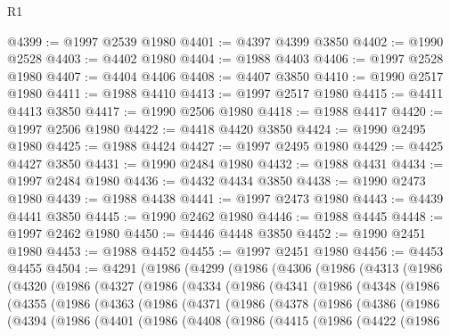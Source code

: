 \begin{lexlean}{R1}
\begin{coremodule}
@4399 := @1997 @2539 @1980
@4401 := @4397 @4399 @3850
@4402 := @1990 @2528
@4403 := @4402 @1980
@4404 := @1988 @4403
@4406 := @1997 @2528 @1980
@4407 := @4404 @4406
@4408 := @4407 @3850
@4410 := @1990 @2517 @1980
@4411 := @1988 @4410
@4413 := @1997 @2517 @1980
@4415 := @4411 @4413 @3850
@4417 := @1990 @2506 @1980
@4418 := @1988 @4417
@4420 := @1997 @2506 @1980
@4422 := @4418 @4420 @3850
@4424 := @1990 @2495 @1980
@4425 := @1988 @4424
@4427 := @1997 @2495 @1980
@4429 := @4425 @4427 @3850
@4431 := @1990 @2484 @1980
@4432 := @1988 @4431
@4434 := @1997 @2484 @1980
@4436 := @4432 @4434 @3850
@4438 := @1990 @2473 @1980
@4439 := @1988 @4438
@4441 := @1997 @2473 @1980
@4443 := @4439 @4441 @3850
@4445 := @1990 @2462 @1980
@4446 := @1988 @4445
@4448 := @1997 @2462 @1980
@4450 := @4446 @4448 @3850
@4452 := @1990 @2451 @1980
@4453 := @1988 @4452
@4455 := @1997 @2451 @1980
@4456 := @4453 @4455
@4504 := @4291
    (@1986
      (@4299
        (@1986
          (@4306
            (@1986
              (@4313
                (@1986
                  (@4320
                    (@1986
                      (@4327
                        (@1986
                          (@4334
                            (@1986
                              (@4341
                                (@1986
                                  (@4348
                                    (@1986
                                      (@4355
                                        (@1986
                                          (@4363
                                            (@1986
                                              (@4371
                                                (@1986
                                                  (@4378
                                                    (@1986
                                                      (@4386
                                                        (@1986
                                                          (@4394
                                                            (@1986
                                                              (@4401
                                                                (@1986
                                                                  (@4408
                                                                    (@1986
                                                                      (@4415
                                                                        (@1986
                                                                          (@4422
                                                                            (@1986

\end{coremodule}
\end{lexlean}
